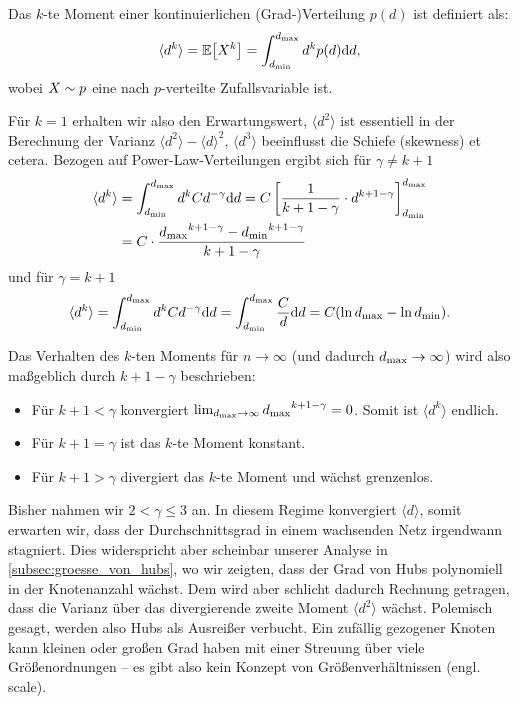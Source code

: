 Das $k$-te Moment einer kontinuierlichen (Grad-)Verteilung $p(d)$ ist definiert als:
\begin{equation}
    \langle d^k \rangle = \mathbb{E}\!\left[X^k\right] = \int_{{d_{\text{min}}}}^{{d_{\text{max}}}} d^k p(d) \text d d,
\end{equation}
wobei $X \sim p$ eine nach $p$-verteilte Zufallsvariable ist.

Für $k=1$ erhalten wir also den Erwartungswert, $\langle d^2 \rangle$ ist essentiell in der Berechnung der Varianz $\langle d^2 \rangle - \langle d \rangle^2$, $\langle d^3 \rangle$ beeinflusst die Schiefe (skewness) et cetera.
Bezogen auf Power-Law-Verteilungen ergibt sich für $\gamma \neq k + 1$
\begin{align}
    \langle d^k \rangle
    & = \int_{{d_{\text{min}}}}^{{d_{\text{max}}}} d^k C d^{-\gamma} \text d d
    = C \left[ \frac{1}{k + 1 - \gamma} \cdot d^{k + 1 -\gamma}\right]_{{d_{\text{min}}}}^{{d_{\text{max}}}}    \\
    & = C \cdot \frac{{d_{\text{max}}}^{k + 1 -\gamma} - {d_{\text{min}}}^{k + 1 -\gamma}}{k + 1 - \gamma}
\end{align}
und für $\gamma = k + 1$
\begin{equation}
	\langle d^k \rangle
	= \int_{{d_{\text{min}}}}^{{d_{\text{max}}}} d^k C d^{-\gamma} \text d d
	= \int_{{d_{\text{min}}}}^{{d_{\text{max}}}} \frac{C}{d} \text d d
	= C ( \ln {d_{\text{max}}} - \ln {d_{\text{min}}} ).
\end{equation}

Das Verhalten des $k$-ten Moments für $n \to \infty$ (und dadurch ${d_{\text{max}}} \to \infty$) wird also maßgeblich durch $k + 1 - \gamma$ beschrieben:
\begin{itemize}
    \item Für $k + 1 < \gamma$ konvergiert $\lim_{{d_{\text{max}}} \to \infty} {d_{\text{max}}}^{k + 1 -\gamma} = 0$.
          Somit ist $\langle d^k \rangle$ endlich.

    \item Für $k + 1 = \gamma$ ist das $k$-te Moment konstant.

    \item Für $k + 1 > \gamma$ divergiert das $k$-te Moment und wächst grenzenlos.
\end{itemize}

\noindent
Bisher nahmen wir $2 < \gamma \le 3$ an.
In diesem Regime konvergiert $\langle d \rangle$, somit erwarten wir, dass der Durchschnittsgrad in einem wachsenden Netz irgendwann stagniert.
Dies widerspricht aber scheinbar unserer Analyse in \cref{subsec:groesse_von_hubs}, wo wir zeigten, dass der Grad von Hubs polynomiell in der Knotenanzahl wächst.
Dem wird aber schlicht dadurch Rechnung getragen, dass die Varianz über das divergierende zweite Moment $\langle d^2 \rangle$ wächst.
Polemisch gesagt, werden also Hubs als Ausreißer verbucht.
Ein zufällig gezogener Knoten kann kleinen oder großen Grad haben mit einer Streuung über viele Größenordnungen -- es gibt also kein Konzept von Größenverhältnissen (engl. scale).